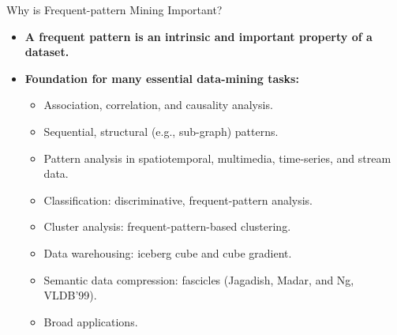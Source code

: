 \begin{frame}{Why is Frequent-pattern Mining Important?}
	\begin{itemize}
		\item \textbf{A frequent pattern is an intrinsic and important property
			      of a dataset.}
		\item \textbf{Foundation for many essential data-mining tasks:}
		      \begin{itemize}
			      \item Association, correlation, and causality analysis.
			      \item Sequential, structural (e.g., sub-graph) patterns.
			      \item Pattern analysis in spatiotemporal, multimedia, time-series,
			            and stream data.
			      \item Classification: discriminative, frequent-pattern analysis.
			      \item Cluster analysis: frequent-pattern-based clustering.
			      \item Data warehousing: iceberg cube and cube gradient.
			      \item Semantic data compression: fascicles (Jagadish, Madar, and
			            Ng, VLDB'99).
			      \item Broad applications.
		      \end{itemize}
	\end{itemize}
\end{frame}

